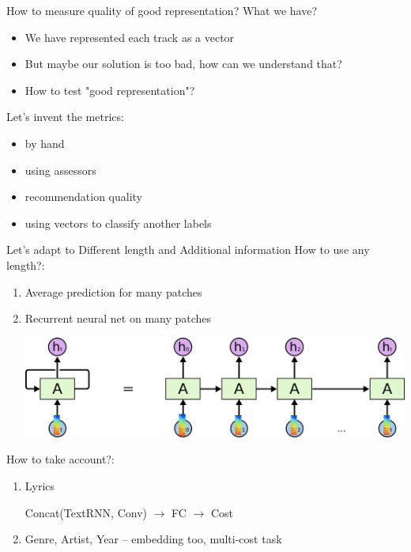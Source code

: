 \documentclass{beamer}
\begin{document}
\begin{frame}{How to measure quality of good representation?} 
	What we have?
	\begin{itemize}
		\item We have represented each track as a vector
		\item But maybe our solution is too bad, how can we understand that?
		\item How to test "good representation"?
	\end{itemize}
	
	Let's invent the metrics:
	
		\begin{itemize}
			\item by hand
			\item using assessors
			\item recommendation quality 
			\item using vectors to classify another labels
		\end{itemize}
\end{frame}

\begin{frame}{Let's adapt to Different length and Additional information} 
	How to use any length?:
		\begin{enumerate}
			\item Average prediction for many patches 		
			\item Recurrent neural net on many patches
				\begin{center}				
					\includegraphics[scale=0.25]{img/rnn}
				\end{center} 
		\end{enumerate}
	How to take account?:
		\begin{enumerate}
			\item Lyrics
				\begin{center}
					Concat(TextRNN, Conv) $\rightarrow$ FC $\rightarrow$ Cost
				\end{center}
			 \item Genre, Artist, Year -- embedding too, multi-cost task
		\end{enumerate}
\end{frame}
\end{document}
